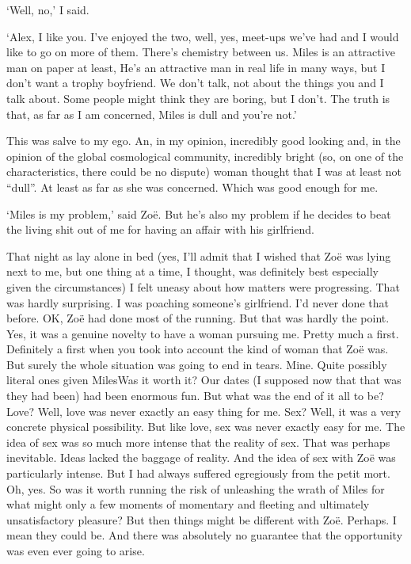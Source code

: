 `Well, no,' I said.

`Alex, I like you. I've enjoyed the two, well, yes, meet-ups  we've had and I would like to go on more of them. There's chemistry between us. Miles is an
attractive man on paper at least, He's an attractive man in real life in many ways, but I don't want a trophy
boyfriend. We don't talk, not about the things you and I talk about. Some people might think they are boring, but I don't.
The truth is that, as far as I am concerned, Miles is dull and you're not.'

This was salve to my ego. An, in my opinion, incredibly good looking
and, in the opinion of the global cosmological community, incredibly
bright (so, on one of the characteristics, there could be no
dispute) woman thought that I was at least not ``dull''. At least as far as she was concerned. Which was good enough for me.

`Miles is my problem,' said Zoë. But he's also my problem if he
decides to beat the living shit out of me for having an affair with
his girlfriend.

That night as lay alone in bed (yes, I'll admit that I wished that
Zoë was lying next to me, but one thing at a time, I thought,
was definitely best especially given the circumstances) I felt uneasy about how
matters were progressing. That was hardly surprising. I was poaching
someone's girlfriend. I'd never done that before. OK, Zoë had
done most of the running. But that was hardly the point. Yes, it was
a genuine novelty to have a woman pursuing me. Pretty much a first.
Definitely a first when you took into account the kind of woman that
Zoë was. But surely the whole situation was going to end in tears.
Mine. Quite possibly literal ones given MilesWas it worth it? Our dates (I supposed now that that was they
had been) had been enormous fun. But what was the end of it all to
be? Love? Well, love was never exactly an easy thing for me. Sex?
Well, it was a very concrete physical possibility. But like love,
sex was never exactly easy for me. The idea of sex was so much more
intense that the reality of sex. That was perhaps inevitable. Ideas
lacked the baggage of reality. And the idea of sex with Zoë was particularly intense. But I had always suffered egregiously
from the petit mort. Oh, yes. So was it worth running the risk of
unleashing the wrath of Miles for what might only a few moments of
momentary and fleeting and ultimately unsatisfactory pleasure? But then things might be different with Zoë. Perhaps. I mean they could be. And there was absolutely no guarantee that the opportunity was even ever going to arise.

